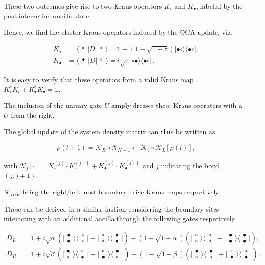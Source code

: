 \documentclass[aps,prl,twocolumn,groupedaddress,superscriptaddress,colorlinks,bookmarks=false,citecolor=darkspringgreen,linkcolor=darkolivegreen,urlcolor=navyblue]{revtex4-1}
\newcommand{\threestate}[3]{
\begin{matrix}
#1\\[-.25cm]
#2#3
\end{matrix}
}
\newcommand{\twostate}[2]{
\begin{matrix}
#1\\[-.25cm]
#2
\end{matrix}
}
\newcommand{\kett}[1]{\lvert #1 \rangle}
\newcommand{\brat}[1]{\langle #1 \rvert}
\begin{document}
These two outcomes give rise to two Kraus operators $K_\circ$ and $K_\bullet$, labeled by the post-interaction ancilla state.

Hence, we find the cluster Kraus operators induced by the QCA update, viz.


\begin{align}
    K_\circ &= \brat{\threestate{\circ}{\ }{\ }} D \kett{\threestate{\circ}{\ }{\ }} =
    \mathds{1} - (1-\sqrt{1-\tau})  \kett{\bullet\circ}\brat{\bullet\circ},\\

    K_\bullet &= \brat{\threestate{\bullet}{\ }{\ }} D \kett{\threestate{\circ}{\ }{\ }} =
     i\sqrt{\tau} \kett{\circ\bullet}\brat{\bullet\circ} \ .
\end{align}


It is easy to verify that these operators form a valid Kraus map $K_\circ^\dagger K_\circ +  K_\bullet^\dagger K_\bullet = \mathds{1}$.

The inclusion of the unitary gate $U$ simply dresses these Kraus operators with a $U$ from the right.

The global update of the system density matrix can thus be written as

\begin{align} \label{evol}
    \rho(t+1) = \mathcal{K}_{R} \circ \mathcal{K}_{N-1} \circ \cdots \mathcal{K}_1 \circ \mathcal{K}_L [\rho(t)],
\end{align}


with $\mathcal{K}_j[ \cdot  ] = K^{(j)}_\circ  \cdot  K^{(j)\dagger}_\circ +  K^{(j)}_\bullet \cdot K^{(j)\dagger}_\bullet$ and $j$ indicating the bond $(j,j+1)$.

$\mathcal{K}_{R/L}$ being the right/left most boundary drive Kraus maps respectively.

These can be derived in a similar fashion considering the boundary sites interacting with an additional ancilla through the following gates respectively.


\begin{align}
    D_L &=\mathds{1} +i \sqrt{\alpha}(\kett{\twostate{\bullet}{\bullet}} \brat{\twostate{\circ}{\circ}}+\kett{\twostate{\circ}{\circ}} \brat{\twostate{\bullet}{\bullet}})-(1-\sqrt{
    1-\alpha})(\kett{\twostate{\circ}{\circ}} \brat{\twostate{\circ}{\circ}}+\kett{\twostate{\bullet}{\bullet}} \brat{\twostate{\bullet}{\bullet}}),\\
    D_R &= \mathds{1}+i \sqrt{\beta} (\kett{\twostate{\bullet}{\circ}} \brat{\twostate{\circ}{\bullet}}+\kett{\twostate{\circ}{\bullet}} \brat{\twostate{\bullet}{\circ}}) -(1- \sqrt{1-\beta}) (\kett{\twostate{\bullet}{\circ}} \brat{\twostate{\bullet}{\circ}}+\kett{\twostate{\circ}{\bullet}} \brat{\twostate{\circ}{\bullet}})\ .
\end{align}
\end{document}
